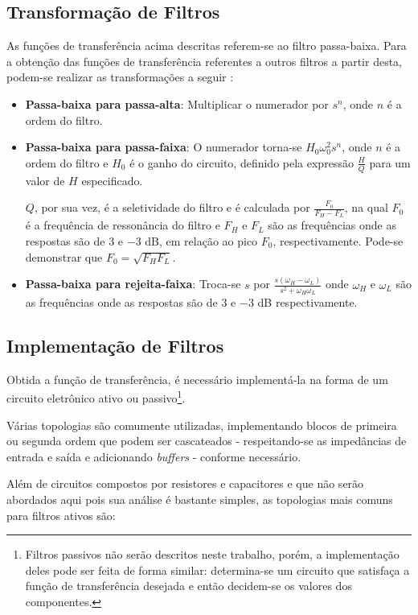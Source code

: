 \subsection{Transformação de Filtros}
As funções de transferência acima descritas referem-se ao filtro passa-baixa. Para a obtenção das funções de transferência referentes a outros filtros a partir desta, podem-se realizar as transformações a seguir \cite{zumbalen}:
\begin{itemize}
\item{\textbf{Passa-baixa para passa-alta}:} Multiplicar o numerador por $s^n$, onde $n$ é a ordem do filtro.
\item{\textbf{Passa-baixa para passa-faixa}:} O numerador torna-se $H_0 \omega_0^2 s^n$, onde $n$ é a ordem do filtro e $H_0$ é o ganho do circuito, definido pela expressão $\frac{H}{Q}$ para um valor de $H$ especificado. 

$Q$, por sua vez, é a seletividade do filtro e é calculada por $\frac{F_0}{F_H - F_L}$, na qual $F_0$ é a frequência de ressonância do filtro e $F_H$ e $F_L$ são as frequências onde as respostas são de $3$ e $-3$ dB, em relação ao pico $F_0$, respectivamente. Pode-se demonstrar que $F_0 = \sqrt{F_H F_L}$.

\item{\textbf{Passa-baixa para rejeita-faixa}:} Troca-se $s$ por $\frac{s (\omega_H - \omega_L)}{s^2 + \omega_H \omega_L}$ onde $\omega_H$ e $\omega_L$ são as frequências onde as respostas são de $3$ e $-3$ dB respectivamente.
\end{itemize}


\subsection{Implementação de Filtros}

Obtida a função de transferência, é necessário implementá-la na forma de um circuito eletrônico ativo ou passivo\footnote{Filtros passivos não serão descritos neste trabalho, porém, a implementação deles pode ser feita de forma similar: determina-se um circuito que satisfaça a função de transferência desejada e então decidem-se os valores dos componentes.}.  

Várias topologias são comumente utilizadas, implementando blocos de primeira ou segunda ordem que podem ser cascateados - respeitando-se as impedâncias de entrada e saída e adicionando \textit{buffers} - conforme necessário.

Além de circuitos compostos por resistores e capacitores e que não serão abordados aqui pois sua análise é bastante simples, as topologias mais comuns para filtros ativos são:

